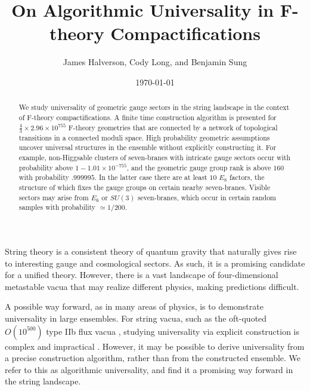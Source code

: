 \documentclass[aps,prl,twocolumn, superscriptaddress,groupedaddress,nofootinbib]{revtex4-1}
\begin{document}
\title{On Algorithmic Universality in F-theory Compactifications}
\author{James Halverson, Cody Long, and Benjamin Sung}

\date{\today}

\begin{abstract}
We study universality of geometric gauge sectors in the string landscape
in the context of F-theory compactifications.
 A finite time construction algorithm is presented for $\frac43 \times 2.96 \times 10^{755}$ F-theory geometries that are
connected by a network of topological transitions in a
connected moduli space. High probability geometric
assumptions uncover universal structures in the ensemble without
explicitly constructing it. For example, non-Higgsable clusters
of seven-branes with intricate gauge sectors occur with
probability above $1-1.01\times 10^{-755}$,  and
the geometric gauge group rank is above $160$ with probability
$.999995$. In the latter case there are at least $10$ $E_8$
factors, the structure of which fixes the gauge groups
on certain nearby seven-branes. Visible sectors may arise from $E_6$ or $SU(3)$ seven-branes, which occur
in certain random samples with probability $\simeq 1/200$.
\end{abstract}

\maketitle


String theory is a consistent theory of quantum gravity that naturally
gives rise to interesting gauge and cosmological sectors. As
such, it is a promising candidate for a unified theory. However, there is a vast 
landscape of four-dimensional metastable vacua that
may realize different physics, making predictions difficult.


A possible way forward, as in many areas of physics, is to demonstrate
universality in large ensembles. For string vacua, such as the oft-quoted
$O(10^{500})$ type IIb flux vacua
\cite{Bousso:2000xa,*Ashok:2003gk,*Denef:2004ze}, studying universality via
explicit construction is complex and impractical
\cite{Denef:2006ad,*Cvetic:2010ky}. However, it may be possible to derive
universality from a precise construction algorithm, rather than from the
constructed ensemble. We refer to this as algorithmic universality, and find it a
promising way forward in the string landscape.
\end{document}
